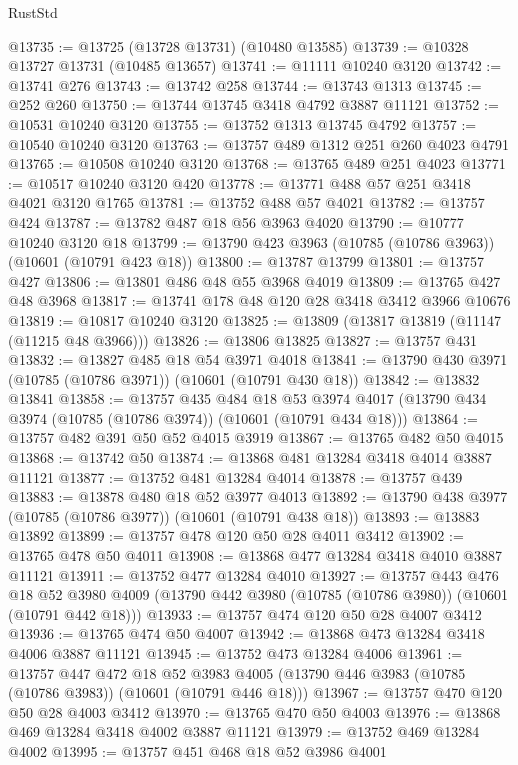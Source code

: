 \begin{lexlean}{RustStd}
\begin{coremodule}
@13735 := @13725 (@13728 @13731) (@10480 @13585)
@13739 := @10328 @13727 @13731 (@10485 @13657)
@13741 := @11111 @10240 @3120
@13742 := @13741 @276
@13743 := @13742 @258
@13744 := @13743 @1313
@13745 := @252 @260
@13750 := @13744 @13745 @3418 @4792 @3887 @11121
@13752 := @10531 @10240 @3120
@13755 := @13752 @1313 @13745 @4792
@13757 := @10540 @10240 @3120
@13763 := @13757 @489 @1312 @251 @260 @4023 @4791
@13765 := @10508 @10240 @3120
@13768 := @13765 @489 @251 @4023
@13771 := @10517 @10240 @3120 @420
@13778 := @13771 @488 @57 @251 @3418 @4021 @3120 @1765
@13781 := @13752 @488 @57 @4021
@13782 := @13757 @424
@13787 := @13782 @487 @18 @56 @3963 @4020
@13790 := @10777 @10240 @3120 @18
@13799 := @13790 @423 @3963 (@10785 (@10786 @3963)) (@10601 (@10791 @423 @18))
@13800 := @13787 @13799
@13801 := @13757 @427
@13806 := @13801 @486 @48 @55 @3968 @4019
@13809 := @13765 @427 @48 @3968
@13817 := @13741 @178 @48 @120 @28 @3418 @3412 @3966 @10676
@13819 := @10817 @10240 @3120
@13825 := @13809 (@13817 @13819 (@11147 (@11215 @48 @3966)))
@13826 := @13806 @13825
@13827 := @13757 @431
@13832 := @13827 @485 @18 @54 @3971 @4018
@13841 := @13790 @430 @3971 (@10785 (@10786 @3971)) (@10601 (@10791 @430 @18))
@13842 := @13832 @13841
@13858 := @13757
    @435
    @484
    @18
    @53
    @3974
    @4017
    (@13790 @434 @3974 (@10785 (@10786 @3974)) (@10601 (@10791 @434 @18)))
@13864 := @13757 @482 @391 @50 @52 @4015 @3919
@13867 := @13765 @482 @50 @4015
@13868 := @13742 @50
@13874 := @13868 @481 @13284 @3418 @4014 @3887 @11121
@13877 := @13752 @481 @13284 @4014
@13878 := @13757 @439
@13883 := @13878 @480 @18 @52 @3977 @4013
@13892 := @13790 @438 @3977 (@10785 (@10786 @3977)) (@10601 (@10791 @438 @18))
@13893 := @13883 @13892
@13899 := @13757 @478 @120 @50 @28 @4011 @3412
@13902 := @13765 @478 @50 @4011
@13908 := @13868 @477 @13284 @3418 @4010 @3887 @11121
@13911 := @13752 @477 @13284 @4010
@13927 := @13757
    @443
    @476
    @18
    @52
    @3980
    @4009
    (@13790 @442 @3980 (@10785 (@10786 @3980)) (@10601 (@10791 @442 @18)))
@13933 := @13757 @474 @120 @50 @28 @4007 @3412
@13936 := @13765 @474 @50 @4007
@13942 := @13868 @473 @13284 @3418 @4006 @3887 @11121
@13945 := @13752 @473 @13284 @4006
@13961 := @13757
    @447
    @472
    @18
    @52
    @3983
    @4005
    (@13790 @446 @3983 (@10785 (@10786 @3983)) (@10601 (@10791 @446 @18)))
@13967 := @13757 @470 @120 @50 @28 @4003 @3412
@13970 := @13765 @470 @50 @4003
@13976 := @13868 @469 @13284 @3418 @4002 @3887 @11121
@13979 := @13752 @469 @13284 @4002
@13995 := @13757
    @451
    @468
    @18
    @52
    @3986
    @4001

\end{coremodule}
\end{lexlean}
